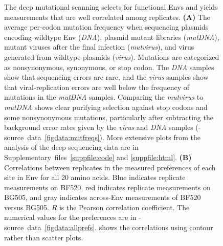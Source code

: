 \documentclass[9pt]{elife}
\begin{document}
\begin{figure}
\caption{\label{fig:mutfreqs}
The deep mutational scanning selects for functional Envs and yields measurements that are well correlated among replicates.
{\bf (A)}
The average per-codon mutation frequency when sequencing plasmids encoding wildtype Env (\emph{DNA}), plasmid mutant libraries (\emph{mutDNA}), mutant viruses after the final infection (\emph{mutvirus}), and virus generated from wildtype plasmids (\emph{virus}).
Mutations are categorized as nonsynonymous, synonymous, or stop codon. 
The \emph{DNA} samples show that sequencing errors are rare, and the \emph{virus} samples show that viral-replication errors are well below the frequency of mutations in the \emph{mutDNA} samples.
Comparing the \emph{mutvirus} to \emph{mutDNA} shows clear purifying selection against stop codons and some nonsynonymous mutations, particularly after subtracting the background error rates given by the \emph{virus} and \emph{DNA} samples (-source~data~\ref{figdata:mutfreqs}).
More extensive plots from the analysis of the deep sequencing data are in Supplementary~files~\ref{suppfile:code} and \ref{suppfile:html}.
{\bf (B)}
Correlations between replicates in the measured preferences of each site in Env for all 20 amino acids.
Blue indicates replicate measurements on BF520, red indicates replicate measurements on BG505, and gray indicates across-Env measurements of BF520 versus BG505.
$R$ is the Pearson correlation coefficient. 
The numerical values for the preferences are in -source~data~\ref{figdata:allprefs}.
 shows the correlations using contour rather than scatter plots.
}
\end{figure}
\end{document}
